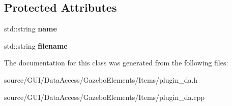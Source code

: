 \subsection*{Protected Attributes}
\begin{DoxyCompactItemize}
\item 
std\+::string {\bfseries name}\label{classplugin___d_a_a7e8201f02123d5bc2623acc2ed350339}

\item 
std\+::string {\bfseries filename}\label{classplugin___d_a_af06fca90dcd322c1cfbb03e2c0ea4dd8}

\end{DoxyCompactItemize}


The documentation for this class was generated from the following files\+:\begin{DoxyCompactItemize}
\item 
source/\+G\+U\+I/\+Data\+Access/\+Gazebo\+Elements/\+Items/plugin\+\_\+da.\+h\item 
source/\+G\+U\+I/\+Data\+Access/\+Gazebo\+Elements/\+Items/plugin\+\_\+da.\+cpp\end{DoxyCompactItemize}
